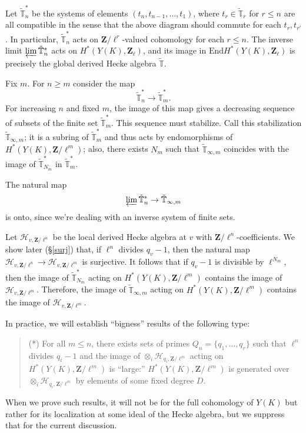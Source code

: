 \documentclass[10pt]{amsart}
\newcommand{\Z}{\mathbf{Z}}
\newcommand{\gHecke}{\tilde{\mathbb{T}}}
\newcommand{\End}{\mathrm{End}}
\newcommand{\dHecke}{\mathscr{H}}
\theoremstyle{remark}
\begin{document}
Let $\gHecke_{n}^*$ be the  systems of elements  
$(t_n , t_{n-1}, \dots, t_1)$, where
$t_r \in \widetilde{\mathbb{T}}_r$ for $ r  \leq n$ are all compatible in the sense that the above diagram should commute for each $t_{r}, t_{r'}$. 
In particular, $\gHecke_{n}^*$ acts on $\Z/\ell^r$-valued cohomology for each $  r \leq n$. 
The inverse limit
$\varprojlim \gHecke_n^*$ acts on $H^*(Y(K), \Z_{\ell})$, and its
image in $\End H^*(Y(K), \Z_{\ell})$ is precisely the global derived Hecke algebra $\gHecke$. 


 Fix $m$. For $n \geq m$  consider
 the map
 $$\gHecke_n^* \rightarrow \tilde{\mathbb{T}}_m^*.$$ 
%
For increasing $n$ and fixed $m$, the image of this map  gives a decreasing sequence of subsets of  the finite set $\tilde{\mathbb{T}}_m^*$. 
This sequence must stabilize. Call this stabilization
$\gHecke_{\infty,m}$; it is a subring of $\widetilde{\mathbb{T}}_m^*$ and thus acts by 
  endomorphisms of $H^*(Y(K), \Z/\ell^m)$; 
  also,  there exists 
$N_m$ such that $\gHecke_{\infty,m}$
coincides with the image of $ \gHecke_{N_m}^*$
in $\tilde{\mathbb{T}}_m^*$.  
  
The natural map
\begin{equation} \label{ontoness} \varprojlim \gHecke_n^* \rightarrow \gHecke_{\infty,m}\end{equation}
is onto, since we're dealing with an inverse system of finite sets. 


Let $\dHecke_{v, \Z/\ell^n}$ be the local derived Hecke algebra at $v$ with $\Z/\ell^n$-coefficients.
We show later (\S \ref{surj}) that, if $\ell^n$ divides $q_v -1$, then the natural map
$\dHecke_{v, \Z/\ell^n} \rightarrow \dHecke_{v, \Z/\ell^m}$ is surjective.  
 It follows that if $q_v-1$ is divisible by $\ell^{N_m}$, then  the image of 
  $ \gHecke_{N_m}^*$ acting on $H^*(Y(K), \Z/\ell^m)$
contains the image of $\dHecke_{v, \Z/\ell^{m}}$.  
Therefore, the image of
  $\gHecke_{\infty,m}$ acting on $H^*(Y(K), \Z/\ell^m)$
contains the image of $\dHecke_{v, \Z/\ell^{m}}$.  

%
%
%
%
%
%
%








 


%
%
%
%
%
In practice, we will establish ``bigness'' results of the following type: 
 \begin{quote}
(*) \label{quotestar} For all $ m \leq n $, there exists sets of primes $Q_n = \{q_1, \dots, q_r\}$
such that $\ell^n$ divides $q_i-1$ and 
the image of $\otimes_i \dHecke_{q_i, \Z/\ell^m}$ acting on $H^*(Y(K), \Z/\ell^m)$
is ``large:'' $H^*(Y(K), \Z/\ell^m)$ is generated over $\otimes_i \dHecke_{q_i, \Z/\ell^m}$    by elements  of some fixed degree $D$. \end{quote} 
  When we prove such results, it will not be for the full cohomology of $Y(K)$ but rather for its localization at some ideal of the Hecke algebra,
  but we suppress that for the current discussion. 
  
\end{document}
